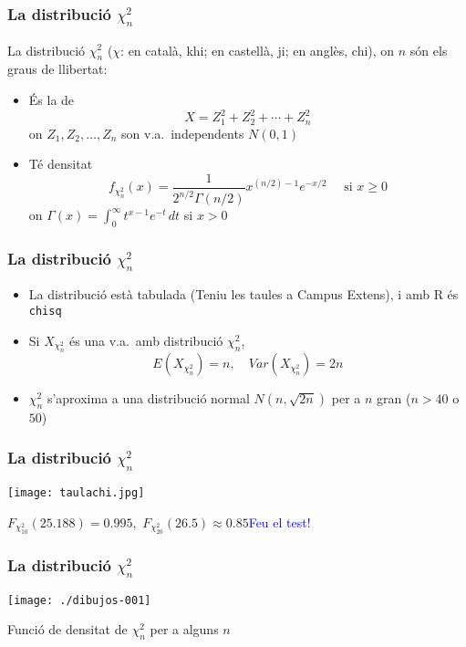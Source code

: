 \documentclass[12pt,t]{beamer}
\newcommand{\blue}[1]{\textcolor{blue}{#1}}
\renewcommand{\emph}[1]{{\color{red}#1}}
\renewcommand{\geq}{\geqslant}
\theoremstyle{plain}
\theoremstyle{definition}
\begin{document}
\begin{frame}
\frametitle{La distribució $\chi_n^2$}

La distribució $\chi_n^2$ ($\chi$: en català, \emph{khi}; en castellà, \emph{ji}; en anglès, \emph{chi}), on $n$ són els \emph{graus de llibertat}:
\begin{itemize}
\item És la de 
$$
X=Z_{1}^{2}+Z_{2}^{2}+\cdots +Z_{n}^{2}
$$ 
on  $Z_{1},Z_{2},\ldots, Z_{n}$ son v.a.\  independents  $N(0,1)$
\medskip

\item Té densitat
$$
f_{\chi_n^2}(x)={\frac{1}{2^{n/2} \Gamma (n/2)}} x^{(n/2)-1} e^{-x/2}\quad\mbox{ si $x\geq 0$}
$$
on $\Gamma(x)=\int_{0}^{\infty} t^{x-1}e^{-t}\, dt$ si $x> 0$

\end{itemize}
\end{frame}


\begin{frame}
\frametitle{La distribució $\chi_n^2$}

\begin{itemize}
\item La distribució està tabulada (\emph{Teniu les taules a Campus Extens}), i amb R és \texttt{chisq}
\bigskip

\item Si $X_{\chi_n^2}$ és una v.a.\ amb distribució  $\chi_n^2$,
$$E(X_{\chi_n^2})=n,\quad Var(X_{\chi_n^2})=2 n$$
\medskip

\item ${\chi_n^2}$ s'aproxima a una distribució normal $N(n,\sqrt{2n})$ per a $n$ gran
($n>40$ o $50$) 
\end{itemize}

\end{frame}

\begin{frame}
\frametitle{La distribució $\chi_n^2$}
\vspace*{-1cm}

\begin{center}
\texttt{[image: taulachi.jpg]}
\end{center}

$F_{\chi_{10}^2}(25.188)=0.995$,\  $F_{\chi_{20}^2}(26.5)\approx 0.85$\quad  \blue{Feu el test!}

\end{frame}


\begin{frame}
\frametitle{La distribució $\chi_n^2$}
\vspace*{-1cm}

\begin{center}
\texttt{[image: ./dibujos-001]}

Funció  de densitat de $\chi^2_n$ per a alguns $n$
\end{center}
\end{frame}
\end{document}

